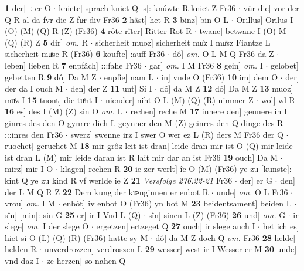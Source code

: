 \documentclass[8pt,a4paper,notitlepage]{article}
\begin{document}
\begin{table}[ht]
\begin{minipage}[t]{0.5\linewidth}
\textbf{1} der] ÷er O  $\cdot$ kniete] sprach kniet Q [s]: knúwte R kniet Z Fr36  $\cdot$ vür die] vor der Q R al da fvr die Z fuͤr div Fr36 \textbf{2} hâst] het R \textbf{3} binz] bin O L  $\cdot$ Orillus] Orilus I (O) (M) (Q) R (Z) (Fr36) \textbf{4} rôte rîter] Ritter Rot R  $\cdot$ twanc] betwanc I (O) M (Q) (R) Z \textbf{5} dir] \textit{om.} R  $\cdot$ sicherheit muoz] sicherheit muͤz I muͯsz Fiantze L sicherheit muͯse R (Fr36) \textbf{6} koufte] :auff Fr36  $\cdot$ dô] \textit{om.} O L M Q Fr36 da Z  $\cdot$ leben] lieben R \textbf{7} enpfâch] :::fahe Fr36  $\cdot$ gar] \textit{om.} I M Fr36 \textbf{8} gein] \textit{om.} I  $\cdot$ gelobet] gebetten R \textbf{9} dô] Da M Z  $\cdot$ enpfie] nam L  $\cdot$ in] vnde O (Fr36) \textbf{10} im] dem O  $\cdot$ der] der da I ouch M  $\cdot$ den] der Z \textbf{11} unt] Si I  $\cdot$ dô] da M Z \textbf{12} dô] Da M Z \textbf{13} muoz] muͤz I \textbf{15} tuont] die tuͤnt I  $\cdot$ niender] niht O L (M) (Q) (R) nimmer Z  $\cdot$ wol] wl R \textbf{16} es] des I (M) (Z) sin O \textit{om.} L  $\cdot$ rechen] reche M \textbf{17} innere den] geunere in I ginres des den O gynrre dich L geynner den M (Z) geinres den Q dinge des R :::inres den Fr36  $\cdot$ swerz] swenne irz I swer O wer ez L (R) ders M Fr36 der Q  $\cdot$ ruochet] geruchet M \textbf{18} mir grôz leit ist dran] leide dran mir ist O (Q) mir leide ist dran L (M) mir leide daran ist R lait mir dar an ist Fr36 \textbf{19} ouch] Da M  $\cdot$ mirz] mir I O  $\cdot$ klagen] rechen R \textbf{20} ie zer werlt] îe O (M) (Fr36) ye zu [kunste]: kint  Q ye zu kind R vf werlde ie Z \textbf{21} \textit{Versfolge 276.22-21} Fr36   $\cdot$ der] er G  $\cdot$ den] der L M Q R Z \textbf{22} Dem kung der kᵫnginnen er enbot R  $\cdot$ unde] \textit{om.} O L Fr36  $\cdot$ vrou] \textit{om.} I M  $\cdot$ enbôt] iv enbot O (Fr36) yn bot M \textbf{23} beidentsament] beiden L  $\cdot$ sîn] [min]: sin G \textbf{25} er] ir I Vnd L (Q)  $\cdot$ sîn] sinen L (Z) (Fr36) \textbf{26} und] \textit{om.} G  $\cdot$ ir slege] \textit{om.} I der slege O  $\cdot$ ergetzen] ertzeget Q \textbf{27} ouch] ir slege auch I  $\cdot$ het ich es] hiet si O (L) (Q) (R) (Fr36) hatte sy M  $\cdot$ dô] da M Z doch Q \textit{om.} Fr36 \textbf{28} helde] helden R  $\cdot$ unverdrozzen] verdroszen L \textbf{29} wesser] west ir I Wesser er M \textbf{30} unde] vnd daz I  $\cdot$ ze herzen] so nahen Q \newline
\end{minipage}
\hspace{0.5cm}
\begin{minipage}[t]{0.5\linewidth}

\end{minipage}
\end{table}
\end{document}

